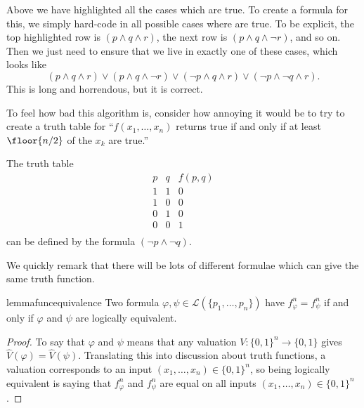 \documentclass[../notes.tex]{subfiles}
\begin{document}
Above we have highlighted all the cases which are true. To create a formula for this, we simply hard-code in all possible cases where are true. To be explicit, the top highlighted row is $(p\land q\land r)$, the next row is $(p\land q\land\lnot r)$, and so on. Then we just need to ensure that we live in exactly one of these cases, which looks like
\[(p\land q\land r)\lor(p\land q\land\lnot r)\lor(\lnot p\land q\land r)\lor(\lnot p\land\lnot q\land r).\]
This is long and horrendous, but it is correct.
\begin{remark}
	To feel how bad this algorithm is, consider how annoying it would be to try to create a truth table for ``$f(x_1,\ldots,x_n)$ returns true if and only if at least $\floor{n/2}$ of the $x_k$ are true.''
\end{remark}
\begin{example}
	The truth table
	\[\begin{array}{c|c||c}
		p & q & f(p,q) \\
		\hline
		1 & 1 & 0 \\
		1 & 0 & 0 \\
		0 & 1 & 0 \\
		0 & 0 & 1 \\
	\end{array}\]
	can be defined by the formula $(\lnot p\land\lnot q)$.
\end{example}
We quickly remark that there will be lots of different formulae which can give the same truth function.
\begin{restatable}{lemma}{funcequivalence}
	Two formula $\varphi,\psi\in\mathcal L(\{p_1,\ldots,p_n\})$ have $f^n_\varphi=f^n_\psi$ if and only if $\varphi$ and $\psi$ are logically equivalent.
\end{restatable}
\begin{proof}
	To say that $\varphi$ and $\psi$ means that any valuation $V:\{0,1\}^n\to\{0,1\}$ gives $\hat V(\varphi)=\hat V(\psi)$. Translating this into discussion about truth functions, a valuation corresponds to an input $(x_1,\ldots,x_n)\in\{0,1\}^n$, so being logically equivalent is saying that $f^n_\varphi$ and $f^n_\psi$ are equal on all inputs $(x_1,\ldots,x_n)\in\{0,1\}^n$.
\end{proof}
\end{document}
